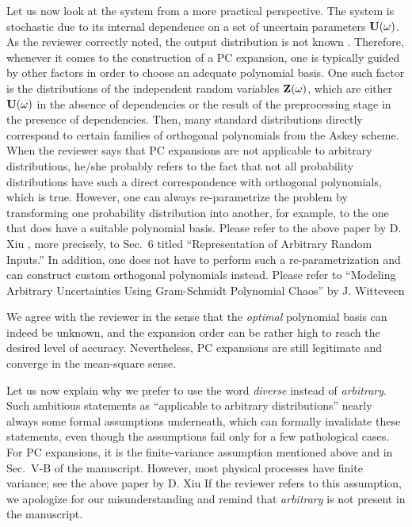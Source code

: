 \begin{authors}
Let us now look at the system from a more practical perspective.
The system is stochastic due to its internal dependence on a set of uncertain parameters $\mathbf{U}(\omega)$.
As the reviewer correctly noted, the output distribution is not known \apriori.
Therefore, whenever it comes to the construction of a PC expansion, one is typically guided by other factors in order to choose an adequate polynomial basis.
One such factor is the distributions of the independent random variables $\mathbf{Z}(\omega)$, which are either $\mathbf{U}(\omega)$ in the absence of dependencies or the result of the preprocessing stage in the presence of dependencies.
Then, many standard distributions directly correspond to certain families of orthogonal polynomials from the Askey scheme.
When the reviewer says that PC expansions are not applicable to arbitrary distributions, he/she probably refers to the fact that not all probability distributions have such a direct correspondence with orthogonal polynomials, which is true.
However, one can always re-parametrize the problem by transforming one probability distribution into another, for example, to the one that does have a suitable polynomial basis.
Please refer to the above paper by D. Xiu \etal, more precisely, to Sec.~6 titled ``Representation of Arbitrary Random Inputs.''
In addition, one does not have to perform such a re-parametrization and can construct custom orthogonal polynomials instead.
Please refer to ``Modeling Arbitrary Uncertainties Using Gram-Schmidt Polynomial Chaos'' by J. Witteveen \etal

We agree with the reviewer in the sense that the \emph{optimal} polynomial basis can indeed be unknown, and the expansion order can be rather high to reach the desired level of accuracy.
Nevertheless, PC expansions are still legitimate and converge in the mean-square sense.

Let us now explain why we prefer to use the word \emph{diverse} instead of \emph{arbitrary}.
Such ambitious statements as ``applicable to arbitrary distributions'' nearly always some formal assumptions underneath, which can formally invalidate these statements, even though the assumptions fail only for a few pathological cases.
For PC expansions, it is the finite-variance assumption mentioned above and in Sec.~V-B of the manuscript.
However, most physical processes have finite variance; see the above paper by D. Xiu \etal{}
If the reviewer refers to this assumption, we apologize for our misunderstanding and remind that \emph{arbitrary} is not present in the manuscript.


\end{authors}

